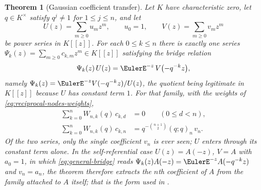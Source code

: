 \documentclass[11pt,a4paper,oneside,openany]{book}
\newtheorem{theorem}{Theorem}[chapter]
\theoremstyle{definition}
\theoremstyle{remark}
\begin{document}
\begin{theorem}[Gaussian coefficient transfer]\label{thm:gaussian-coefficient-transfer}
Let $K$ have characteristic zero, let $q\in K^{\times}$ satisfy $q^j\ne1$ for $1\le j\le n$, and let
\[
 U(z)=\sum_{m\ge0}u_mz^m,\qquad u_0=1,
 \qquad
 V(z)=\sum_{m\ge0}v_mz^m
\]
be power series in $K[[z]]$.  For each $0\le k\le n$ there is exactly one series $\Psi_k(z)=\sum_{m\ge0}c_{k,m}z^m\in K[[z]]$ satisfying the bridge relation
\begin{equation}\label{eq:general-bridge}
 \Psi_k(z)\,U(z)=\EulerE^{-z}\,V\bigl(-q^{-k}z\bigr),
\end{equation}
namely $\Psi_k(z)=\EulerE^{-z}V(-q^{-k}z)/U(z)$, the quotient being legitimate in $K[[z]]$ because $U$ has constant term $1$.  For that family, with the weights of \eqref{eq:reciprocal-nodes-weights},
\begin{align}
 \sum_{k=0}^{n}W_{n,k}(q)\,c_{k,d}&=0
 \qquad(0\le d<n),\label{eq:transfer-lower-zero}\\
 \sum_{k=0}^{n}W_{n,k}(q)\,c_{k,n}
 &=q^{-\binom{n+1}{2}}(q;q)_n\,v_n.\label{eq:transfer-top}
\end{align}
Of the two series, only the single coefficient $v_n$ is ever seen; $U$ enters through its constant term alone.  In the self-referential case $U(z)=A(-z)$, $V=A$ with $a_0=1$, in which \eqref{eq:general-bridge} reads $\Psi_k(z)A(-z)=\EulerE^{-z}A(-q^{-k}z)$ and $v_n=a_n$, the theorem therefore extracts the $n$th coefficient of $A$ from the family attached to $A$ itself; that is the form used in .
\end{theorem}
\end{document}
